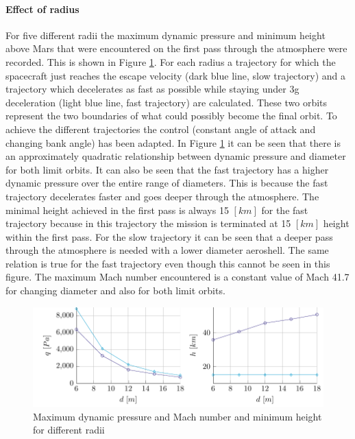 \paragraph{Effect of radius}
For five different radii the maximum dynamic pressure and minimum height above Mars that were encountered on the first pass through the atmosphere were recorded. This is shown in Figure \ref{fig:radius}. For each radius a trajectory for which the spacecraft just reaches the escape velocity (dark blue line, slow trajectory) and a trajectory which decelerates as fast as possible while staying under 3g deceleration (light blue line, fast trajectory) are calculated. These two orbits represent the two boundaries of what could possibly become the final orbit. To achieve the different trajectories the control (constant angle of attack and changing bank angle) has been adapted. In Figure \ref{fig:radius} it can be seen that there is an approximately quadratic relationship between dynamic pressure and diameter for both limit orbits. It can also be seen that the fast trajectory has a higher dynamic pressure over the entire range of diameters. This is because the fast trajectory decelerates faster and goes deeper through the atmosphere. The minimal height achieved in the first pass is always 15 $\left[km\right]$ for the fast trajectory because in this trajectory the mission is terminated at 15 $\left[km\right]$ height within the first pass. For the slow trajectory it can be seen that a deeper pass through the atmosphere is needed with a lower diameter aeroshell. The same relation is true for the fast trajectory even though this cannot be seen in this figure. The maximum Mach number encountered is a constant value of Mach 41.7 for changing diameter and also for both limit orbits.

\begin{figure}[h]
	\centering
	\includegraphics[width=\textwidth]{./Figure/orbit/radius_param2.pdf}
	\caption{Maximum dynamic pressure and Mach number and minimum height for different radii}
	\label{fig:radius}
\end{figure}

